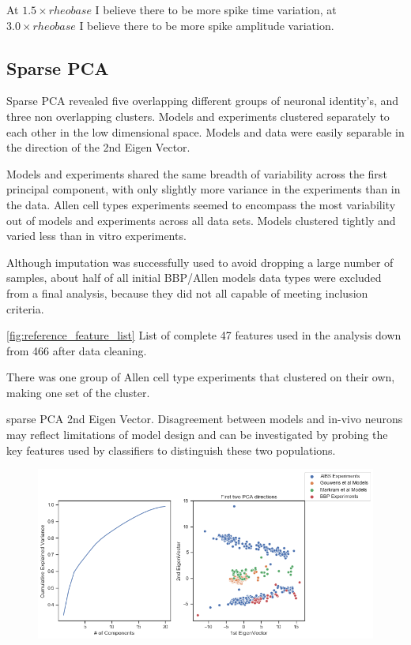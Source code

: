 At $1.5 \times rheobase $ I believe there to be more spike time variation, at $3.0 \times rheobase $  I believe there to be more spike amplitude variation.

\subsection{Sparse PCA}
Sparse PCA revealed five overlapping different groups of neuronal identity's, and three non overlapping clusters. Models and experiments clustered separately to each other in the low dimensional space. Models and data were easily separable in the direction of the 2nd Eigen Vector.

Models and experiments shared the same breadth of variability across the first principal component, with only slightly more variance in the experiments than in the data. Allen cell types experiments seemed to encompass the most variability out of models and experiments across all data sets. Models clustered tightly and varied less than in vitro experiments.



Although imputation was successfully used to avoid dropping a large number of samples, about half of all initial BBP/Allen models data types were excluded from a final analysis, because they did not all capable of meeting inclusion criteria.  

\ref{fig:reference_feature_list}
List of complete 47 features used in the analysis down from 466 after data cleaning.


There was one group of Allen cell type experiments that clustered on their own, making one set of the cluster.

sparse PCA 2nd Eigen Vector. 
Disagreement between models and in-vivo neurons may reflect limitations of model design and can be investigated by probing the key features used by classifiers to distinguish these two populations. 

\begin{figure}    
\begin{center} \includegraphics[width=1.0\linewidth]{figures/cortical_model_data_agreement_52_1}
    \caption[Is this visible]{}
    \label{fig:}
\end{center}
\end{figure}    



